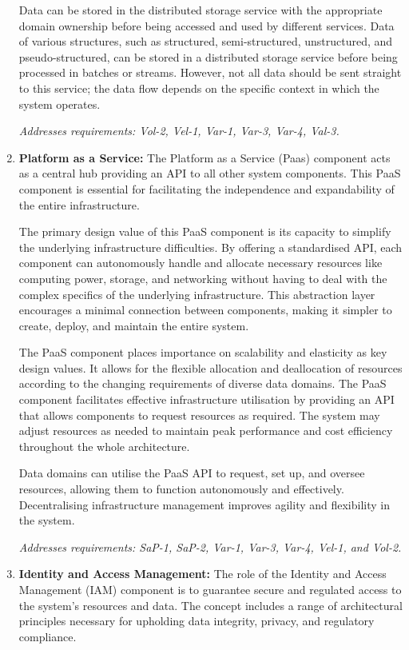 \documentclass[journal]{IEEEtran}
\begin{document}
\begin{enumerate}
    Data can be stored in the distributed storage service with the appropriate domain ownership before being accessed and used by different services. Data of various structures, such as structured, semi-structured, unstructured, and pseudo-structured, can be stored in a distributed storage service before being processed in batches or streams. However, not all data should be sent straight to this service; the data flow depends on the specific context in which the system operates.
    
    \textit{Addresses requirements: Vol-2, Vel-1, Var-1, Var-3, Var-4, Val-3.} 


    \item \textbf{Platform as a Service:} The Platform as a Service (Paas) component acts as a central hub providing an API to all other system components. This PaaS component is essential for facilitating the independence and expandability of the entire infrastructure.

    The primary design value of this PaaS component is its capacity to simplify the underlying infrastructure difficulties. By offering a standardised API, each component can autonomously handle and allocate necessary resources like computing power, storage, and networking without having to deal with the complex specifics of the underlying infrastructure. This abstraction layer encourages a minimal connection between components, making it simpler to create, deploy, and maintain the entire system.
    
    The PaaS component places importance on scalability and elasticity as key design values. It allows for the flexible allocation and deallocation of resources according to the changing requirements of diverse data domains. The PaaS component facilitates effective infrastructure utilisation by providing an API that allows components to request resources as required. The system may adjust resources as needed to maintain peak performance and cost efficiency throughout the whole architecture.
    
    Data domains can utilise the PaaS API to request, set up, and oversee resources, allowing them to function autonomously and effectively. Decentralising infrastructure management improves agility and flexibility in the system.
    
    \textit{Addresses requirements: SaP-1, SaP-2, Var-1, Var-3, Var-4, Vel-1, and Vol-2.} 

    \item \textbf{Identity and Access Management:} The role of the Identity and Access Management (IAM) component is to guarantee secure and regulated access to the system's resources and data. The concept includes a range of architectural principles necessary for upholding data integrity, privacy, and regulatory compliance.


\end{enumerate}
\end{document}
